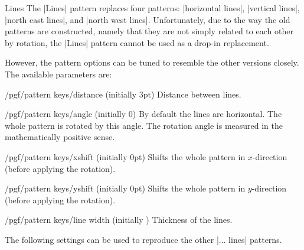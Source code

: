\begin{pattern}{Lines}
    The |Lines| pattern replaces four patterns: |horizontal lines|,
    |vertical lines|, |north east lines|, and |north west lines|.
    Unfortunately, due to
    the way the old patterns are constructed, namely that they are not simply
    related to each other by rotation, the |Lines| pattern cannot be used as a
    drop-in replacement.

    However, the pattern options can be tuned to resemble the other versions
    closely. The available parameters are:
    \begin{key}{/pgf/pattern keys/distance (initially 3pt)}
        Distance between lines.
    \end{key}
    \begin{key}{/pgf/pattern keys/angle (initially 0)}
        By default the lines are horizontal. The whole pattern is rotated by
        this angle. The rotation angle is measured in the mathematically
        positive sense.
    \end{key}
    \begin{key}{/pgf/pattern keys/xshift (initially 0pt)}
        Shifts the whole pattern in $x$-direction (before applying the
        rotation).
    \end{key}
    \begin{key}{/pgf/pattern keys/yshift (initially 0pt)}
        Shifts the whole pattern in $y$-direction (before applying the
        rotation).
    \end{key}
    \begin{key}{/pgf/pattern keys/line width (initially \string\the\string\pgflinewidth)}
        Thickness of the lines.
    \end{key}
    The following settings can be used to reproduce the other |... lines|
    patterns.
\begin{codeexample}[preamble={\usetikzlibrary{patterns,patterns.meta}}]
\end{codeexample}
\end{pattern}

